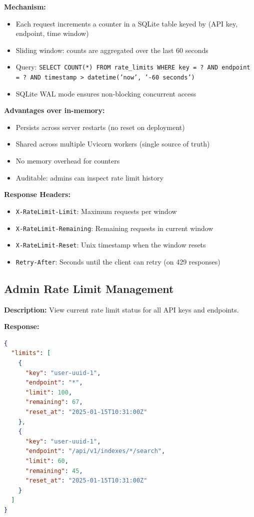 \documentclass[11pt,a4paper]{article}
\newcommand{\cmark}{\textcolor{ctAccentGreen}{\ding{51}}}
\newcommand{\inlinecode}[1]{\texttt{\small\colorbox{ctCodeBg}{#1}}}
\begin{document}
\begin{reqbox}
\textbf{Mechanism:}
\begin{itemize}
    \item Each request increments a counter in a SQLite table keyed by (API key, endpoint, time window)
    \item Sliding window: counts are aggregated over the last 60 seconds
    \item Query: \inlinecode{SELECT COUNT(*) FROM rate\_limits WHERE key = ? AND endpoint = ? AND timestamp > datetime('now', '-60 seconds')}
    \item SQLite WAL mode ensures non-blocking concurrent access
\end{itemize}

\textbf{Advantages over in-memory:}
\begin{itemize}
    \item \cmark{} Persists across server restarts (no reset on deployment)
    \item \cmark{} Shared across multiple Uvicorn workers (single source of truth)
    \item \cmark{} No memory overhead for counters
    \item \cmark{} Auditable: admins can inspect rate limit history
\end{itemize}

\textbf{Response Headers:}
\begin{itemize}
    \item \inlinecode{X-RateLimit-Limit}: Maximum requests per window
    \item \inlinecode{X-RateLimit-Remaining}: Remaining requests in current window
    \item \inlinecode{X-RateLimit-Reset}: Unix timestamp when the window resets
    \item \inlinecode{Retry-After}: Seconds until the client can retry (on 429 responses)
\end{itemize}
\end{reqbox}

\subsection{Admin Rate Limit Management}

\begin{endpointbox}
\textbf{Description:} View current rate limit status for all API keys and endpoints.

\textbf{Response:}
\begin{lstlisting}[language=JSON]
{
  "limits": [
    {
      "key": "user-uuid-1",
      "endpoint": "*",
      "limit": 100,
      "remaining": 67,
      "reset_at": "2025-01-15T10:31:00Z"
    },
    {
      "key": "user-uuid-1",
      "endpoint": "/api/v1/indexes/*/search",
      "limit": 60,
      "remaining": 45,
      "reset_at": "2025-01-15T10:31:00Z"
    }
  ]
}
\end{lstlisting}
\end{endpointbox}
\end{document}
